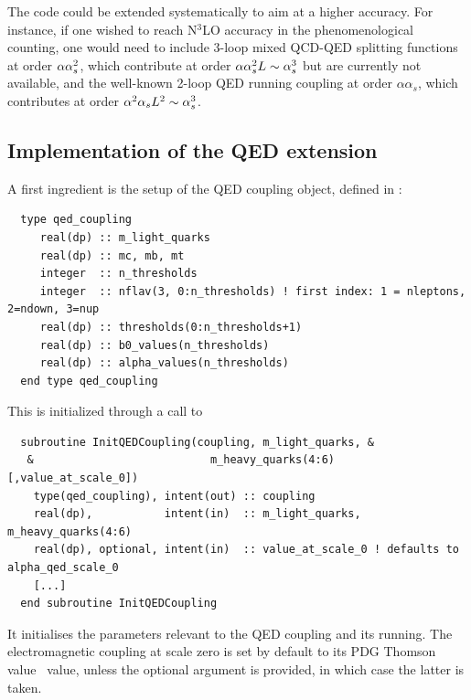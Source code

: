%
The code could be extended systematically to aim at a higher
accuracy. For instance, if one wished to reach N$^3$LO accuracy in the
phenomenological counting, one would need to include 3-loop mixed
QCD-QED splitting functions at order $\alpha \alpha_s^2$, which contribute
at order $\alpha \alpha_s^2 L \sim \alpha_s^3$ but are currently not
available, and the well-known 2-loop QED running coupling at order $\alpha \alpha_s$, which contributes at order $\alpha^2 \alpha_s L^2 \sim \alpha_s^3$.
% 
%


\subsection{Implementation of the QED extension}


A first ingredient is the setup of the QED coupling object, defined in
:
\begin{lstlisting}
  type qed_coupling 
     real(dp) :: m_light_quarks
     real(dp) :: mc, mb, mt
     integer  :: n_thresholds
     integer  :: nflav(3, 0:n_thresholds) ! first index: 1 = nleptons, 2=ndown, 3=nup
     real(dp) :: thresholds(0:n_thresholds+1)
     real(dp) :: b0_values(n_thresholds)
     real(dp) :: alpha_values(n_thresholds)
  end type qed_coupling
\end{lstlisting}
%
This is initialized through a call to 
\begin{lstlisting}
  subroutine InitQEDCoupling(coupling, m_light_quarks, &
   &                           m_heavy_quarks(4:6) [,value_at_scale_0])
    type(qed_coupling), intent(out) :: coupling
    real(dp),           intent(in)  :: m_light_quarks, m_heavy_quarks(4:6)
    real(dp), optional, intent(in)  :: value_at_scale_0 ! defaults to alpha_qed_scale_0
    [...]
  end subroutine InitQEDCoupling
\end{lstlisting}
%
It initialises the parameters relevant to the QED coupling and its
running.  The electromagnetic coupling at scale zero is set by default
to its PDG Thomson value~\cite{ParticleDataGroup:2022pth} value, unless the optional
argument  is provided, in which case the
latter is taken.


